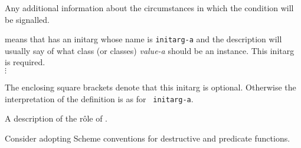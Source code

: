 \begin{optDefinition}
\begin{initoptions}
\end{initoptions}
%
\remarks%
Any additional information about the circumstances in which the
condition will be signalled.
%
%
\begin{initoptions}
    \item[initarg-a, value-a] means that {\tt <a-class>} has an
    initarg whose name is {\tt initarg-a} and the description will usually
    say of what class (or classes) {\em value-a} should be an instance.
    This initarg is required.\\ $\vdots$
    \item[{\tt[}initarg-n, value-n{\tt]}]
    The enclosing square brackets denote that this initarg is optional.
    Otherwise the interpretation of the definition is as for {\tt
        initarg-a}.
\end{initoptions}
%
\remarks%
A description of the r\^ole of {\tt <a-class>}.
%
\end{optDefinition}
%
%
\begin{optPrivate}
    Consider adopting Scheme conventions for destructive and predicate
    functions.
\end{optPrivate}
%
